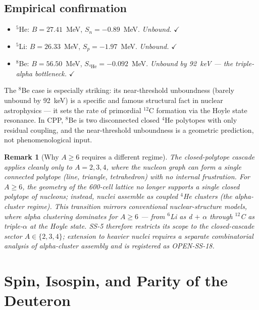 \documentclass[11pt,letterpaper]{article}
\newtheorem{remark}[theorem]{Remark}
\begin{document}
\subsection{Empirical confirmation}

\begin{itemize}
\item ${}^5$He: $B = 27.41$~MeV, $S_n = -0.89$~MeV. \emph{Unbound.} $\checkmark$
\item ${}^5$Li: $B = 26.33$~MeV, $S_p = -1.97$~MeV. \emph{Unbound.} $\checkmark$
\item ${}^8$Be: $B = 56.50$~MeV, $S_{{}^4\mathrm{He}} = -0.092$~MeV. \emph{Unbound by 92~keV --- the triple-alpha bottleneck.} $\checkmark$
\end{itemize}

The ${}^8$Be case is especially striking: its near-threshold unboundness (barely unbound by 92~keV) is a specific and famous structural fact in nuclear astrophysics --- it sets the rate of primordial ${}^{12}$C formation via the Hoyle state resonance. In CPP, ${}^8$Be is two disconnected closed ${}^4$He polytopes with only residual coupling, and the near-threshold unboundness is a geometric prediction, not phenomenological input.

\begin{remark}[Why $A \geq 6$ requires a different regime]
The closed-polytope cascade applies cleanly only to $A = 2, 3, 4$, where the nucleon graph can form a single connected polytope (line, triangle, tetrahedron) with no internal frustration. For $A \geq 6$, the geometry of the 600-cell lattice no longer supports a single closed polytope of nucleons; instead, nuclei assemble as coupled ${}^4$He clusters (the alpha-cluster regime). This transition mirrors conventional nuclear-structure models, where alpha clustering dominates for $A \geq 6$ --- from ${}^6$Li as d $+$ $\alpha$ through ${}^{12}$C as triple-$\alpha$ at the Hoyle state. SS-5 therefore restricts its scope to the closed-cascade sector $A \in \{2,3,4\}$; extension to heavier nuclei requires a separate combinatorial analysis of alpha-cluster assembly and is registered as OPEN-SS-18.
\end{remark}

\section{Spin, Isospin, and Parity of the Deuteron}
\label{sec:spin_isospin}
\end{document}
